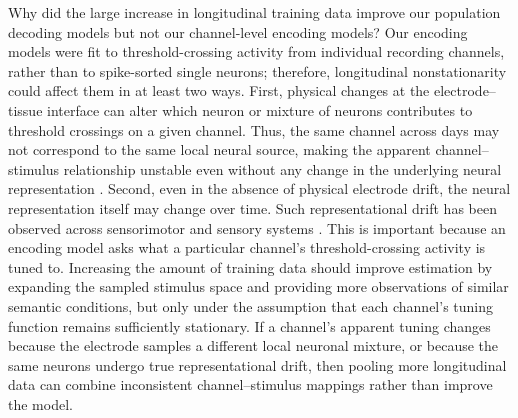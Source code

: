 \documentclass[pdflatex,sn-basic]{sn-jnl}%
\theoremstyle{thmstyleone}%
\theoremstyle{thmstyletwo}%
\theoremstyle{thmstylethree}%
\begin{document}
Why did the large increase in longitudinal training data improve our population decoding models but not our channel-level encoding models? Our encoding models were fit to threshold-crossing activity from individual recording channels, rather than to spike-sorted single neurons; therefore, longitudinal nonstationarity could affect them in at least two ways. First, physical changes at the electrode--tissue interface can alter which neuron or mixture of neurons contributes to threshold crossings on a given channel. Thus, the same channel across days may not correspond to the same local neural source, making the apparent channel--stimulus relationship unstable even without any change in the underlying neural representation \citep{bib99}. Second, even in the absence of physical electrode drift, the neural representation itself may change over time. Such representational drift has been observed across sensorimotor and sensory systems \citep{bib98,bib141,bib142}. This is important because an encoding model asks what a particular channel's threshold-crossing activity is tuned to. Increasing the amount of training data should improve estimation by expanding the sampled stimulus space and providing more observations of similar semantic conditions, but only under the assumption that each channel's tuning function remains sufficiently stationary. If a channel's apparent tuning changes because the electrode samples a different local neuronal mixture, or because the same neurons undergo true representational drift, then pooling more longitudinal data can combine inconsistent channel--stimulus mappings rather than improve the model.
\end{document}
